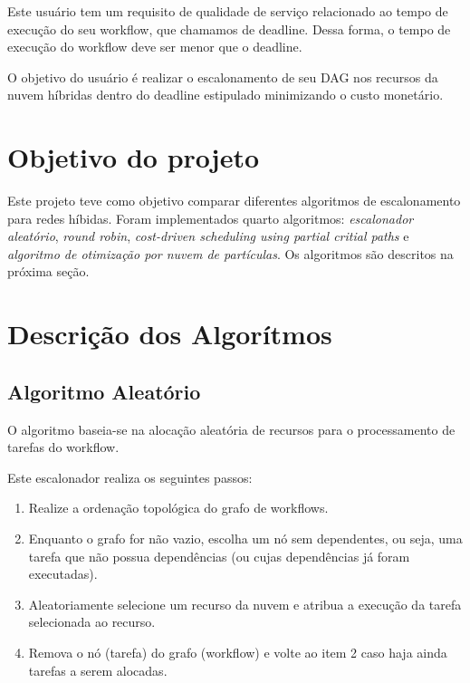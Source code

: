 \documentclass[a4paper,10pt]{article}
\begin{document}
Este usuário tem um requisito de qualidade de serviço relacionado 
ao tempo de execução do seu workflow, que chamamos de deadline. Dessa forma, o tempo 
de execução do workflow deve ser menor que o deadline.

O objetivo do usuário é realizar o escalonamento de seu DAG nos recursos da 
nuvem híbridas dentro do deadline estipulado minimizando o custo monetário.

\section{Objetivo do projeto}

Este projeto teve como objetivo comparar diferentes algoritmos de escalonamento 
para redes híbidas. Foram implementados quarto algoritmos: \emph{escalonador aleatório}, \emph{round robin},
\emph{cost-driven scheduling using partial critial paths} e \emph{algoritmo de otimização por nuvem de partículas}.
Os algoritmos são descritos na próxima seção.

\section{Descrição dos Algorítmos}
\label{algoritmos}

\subsection{Algoritmo Aleatório}

O algoritmo baseia-se na alocação aleatória de recursos para o processamento de tarefas do workflow.

Este escalonador realiza os seguintes passos:

\begin{enumerate}

    \item Realize a ordenação topológica do grafo de workflows.

    \item Enquanto o grafo for não vazio, escolha um nó sem dependentes, ou seja, uma tarefa que não possua dependências 
(ou cujas dependências já foram executadas).

    \item Aleatoriamente selecione um recurso da nuvem e atribua a execução da tarefa selecionada ao recurso.

    \item Remova o nó (tarefa) do grafo (workflow) e volte ao item 2 caso haja ainda tarefas a serem alocadas.

\end{enumerate}
\end{document}

